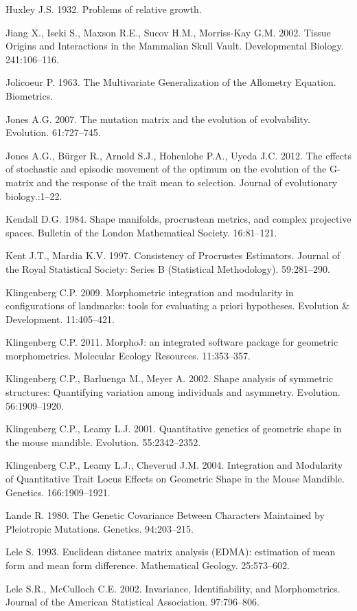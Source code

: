 \documentclass[12pt,]{article}
\begin{document}
Huxley J.S. 1932. Problems of relative growth.

Jiang X., Iseki S., Maxson R.E., Sucov H.M., Morriss-Kay G.M. 2002.
Tissue Origins and Interactions in the Mammalian Skull Vault.
Developmental Biology. 241:106--116.

Jolicoeur P. 1963. The Multivariate Generalization of the Allometry
Equation. Biometrics.

Jones A.G. 2007. The mutation matrix and the evolution of evolvability.
Evolution. 61:727--745.

Jones A.G., Bürger R., Arnold S.J., Hohenlohe P.A., Uyeda J.C. 2012. The
effects of stochastic and episodic movement of the optimum on the
evolution of the G-matrix and the response of the trait mean to
selection. Journal of evolutionary biology.:1--22.

Kendall D.G. 1984. Shape manifolds, procrustean metrics, and complex
projective spaces. Bulletin of the London Mathematical Society.
16:81--121.

Kent J.T., Mardia K.V. 1997. Consistency of Procrustes Estimators.
Journal of the Royal Statistical Society: Series B (Statistical
Methodology). 59:281--290.

Klingenberg C.P. 2009. Morphometric integration and modularity in
configurations of landmarks: tools for evaluating a priori hypotheses.
Evolution \& Development. 11:405--421.

Klingenberg C.P. 2011. MorphoJ: an integrated software package for
geometric morphometrics. Molecular Ecology Resources. 11:353--357.

Klingenberg C.P., Barluenga M., Meyer A. 2002. Shape analysis of
symmetric structures: Quantifying variation among individuals and
asymmetry. Evolution. 56:1909--1920.

Klingenberg C.P., Leamy L.J. 2001. Quantitative genetics of geometric
shape in the mouse mandible. Evolution. 55:2342--2352.

Klingenberg C.P., Leamy L.J., Cheverud J.M. 2004. Integration and
Modularity of Quantitative Trait Locus Effects on Geometric Shape in the
Mouse Mandible. Genetics. 166:1909--1921.

Lande R. 1980. The Genetic Covariance Between Characters Maintained by
Pleiotropic Mutations. Genetics. 94:203--215.

Lele S. 1993. Euclidean distance matrix analysis (EDMA): estimation of
mean form and mean form difference. Mathematical Geology. 25:573--602.

Lele S.R., McCulloch C.E. 2002. Invariance, Identifiability, and
Morphometrics. Journal of the American Statistical Association.
97:796--806.
\end{document}

